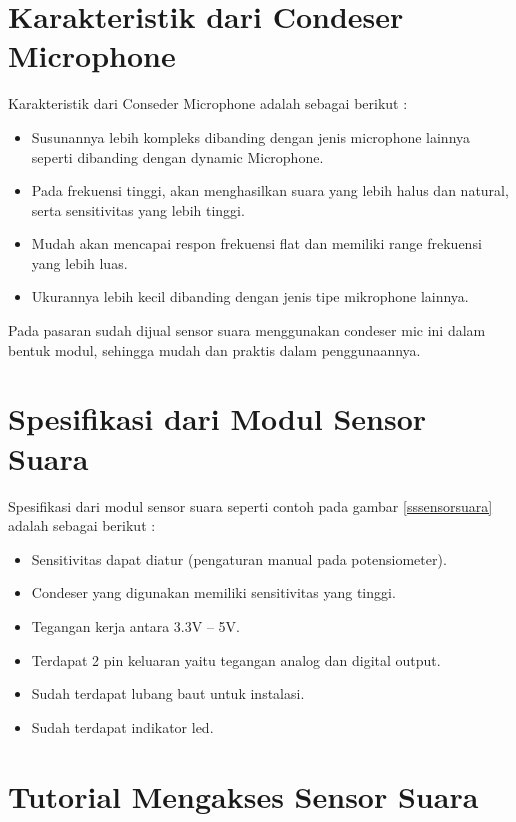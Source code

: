 \section{Karakteristik dari Condeser Microphone}

\hspace{4mm} Karakteristik dari Conseder Microphone adalah sebagai berikut :

\begin{itemize}
\item Susunannya lebih kompleks dibanding dengan jenis microphone lainnya seperti dibanding dengan dynamic Microphone.
\item Pada frekuensi tinggi, akan menghasilkan suara yang lebih halus dan natural, serta sensitivitas yang lebih tinggi.
\item Mudah akan mencapai respon frekuensi flat dan memiliki range frekuensi yang lebih luas.
\item Ukurannya lebih kecil dibanding dengan jenis tipe mikrophone lainnya.
\end{itemize}

Pada pasaran sudah dijual sensor suara menggunakan condeser mic ini dalam bentuk modul, sehingga mudah dan praktis dalam penggunaannya.

\section{Spesifikasi dari Modul Sensor Suara}
	
Spesifikasi dari modul sensor suara seperti contoh pada gambar \ref{sssensorsuara} adalah sebagai berikut :

\begin{itemize}
\item Sensitivitas dapat diatur (pengaturan manual pada potensiometer).
\item Condeser yang digunakan memiliki sensitivitas yang tinggi.
\item Tegangan kerja antara 3.3V – 5V.
\item Terdapat 2 pin keluaran yaitu tegangan analog dan digital output.
\item Sudah terdapat lubang baut untuk instalasi.
\item Sudah terdapat indikator led.
\end{itemize}

\section{Tutorial Mengakses Sensor Suara}

